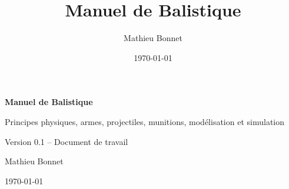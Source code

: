 \documentclass[a4paper,11pt]{book}
\title{Manuel de Balistique}
\author{Mathieu Bonnet}
\date{\today}
\begin{document}
\pagestyle{fancy}

\begin{titlepage}

\centering

\vspace*{4cm}

{\Huge\bfseries Manuel de Balistique\par}

\vspace{1cm}

{\Large Principes physiques, armes, projectiles,
munitions, modélisation et simulation\par}

\vfill

{\Large Version 0.1 -- Document de travail\par}

\vspace{1cm}

Mathieu Bonnet

\vspace{1cm}

\today

\end{titlepage}

\frontmatter


\tableofcontents

\listoffigures

\listoftables

\mainmatter

%
%
%
%
%


%
\end{document}
